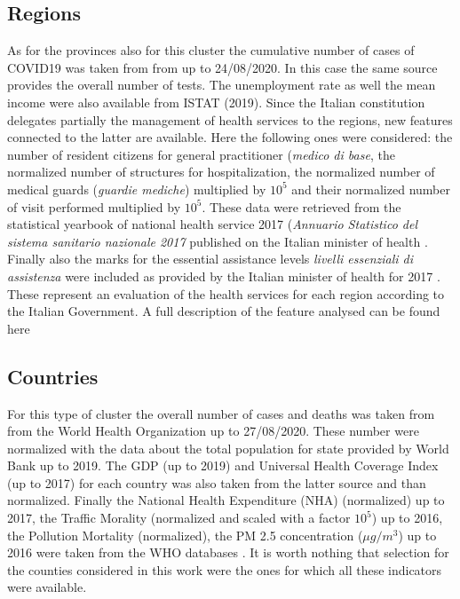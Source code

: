 \documentclass[
12pt, %
a4paper, %
oneside, %
headinclude,footinclude, %
BCOR5mm, %
]{scrartcl}
\begin{document}
\subsection{Regions}
As for the provinces also for this cluster the cumulative number of cases of COVID19 was taken from from \cite{github-protezionecivile} up to 24/08/2020. In this case the same source provides the overall number of tests. The unemployment rate as well the mean income were also available from ISTAT \cite{ISTAT} (2019). Since the Italian constitution delegates partially the management of health services to the regions, new features connected to the latter are available. Here the following ones were considered: the number of resident citizens for general practitioner (\textit{medico di base}, the normalized number of structures for hospitalization, the normalized number of medical guards (\textit{guardie mediche}) multiplied by $10^{5}$ and their normalized number of visit performed multiplied by $10^{5}$. These data were retrieved from the statistical yearbook of national health service 2017 (\textit{Annuario Statistico del sistema sanitario nazionale 2017} published on the Italian minister of health \cite{AnnuarioSSN2017}. Finally also  the marks for the essential assistance levels \textit{livelli essenziali di assistenza} were included as provided by the Italian minister of health for 2017 \cite{LeaRank} . These represent an evaluation of the health services for each region according to the Italian Government. A full description of the feature analysed can be found here \cite{LeaDesc}

\subsection{Countries}

For this type of cluster the overall number of cases and deaths was taken from from the World Health Organization \cite{whoCases} up to 27/08/2020. These number were normalized with the data about the total population for state provided by World Bank \cite{worldBank} up to 2019. The GDP (up to 2019) and Universal Health Coverage Index \cite{whoUHC} (up to 2017) for each country was also taken from the latter source \cite{worldBank} and than normalized. Finally the National Health Expenditure (NHA) (normalized) up to 2017, the Traffic Morality (normalized and scaled with a factor $10^{5}$) up to 2016, the Pollution Mortality (normalized), the PM 2.5 concentration ($\mu g/m^{3}$) up to 2016 were taken from the WHO databases \cite{whoDb}. It is worth nothing that selection for the counties considered in this work were the ones for which all these indicators were available. 
\end{document}
